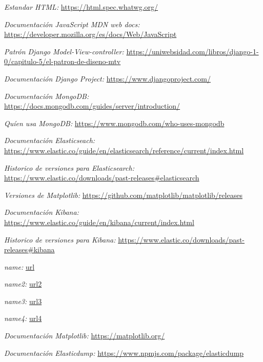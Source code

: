 \documentclass[11pt,a4paper]{book}
\begin{document}
	\begin{thebibliography}{7}
		
		
		\textit{Estandar HTML:}
		\url{https://html.spec.whatwg.org/}
	
		\textit{Documentación JavaScript MDN web docs:}
		\url{https://developer.mozilla.org/es/docs/Web/JavaScript}	
		
		\textit{Patrón Django Model-View-controller:}
		\url{https://uniwebsidad.com/libros/django-1-0/capitulo-5/el-patron-de-diseno-mtv}
		
		\textit{Documentación \textit{Django Project}:}
		\url{https://www.djangoproject.com/}
		
		\textit{Documentación MongoDB:}
		\url{https://docs.mongodb.com/guides/server/introduction/}	
		
		\textit{Quíen usa MongoDB:}
		\url{https://www.mongodb.com/who-uses-mongodb}
		
		\textit{Documentación Elasticseach:}
		\url{https://www.elastic.co/guide/en/elasticsearch/reference/current/index.html}
				
		\textit{Historico de versiones para Elasticsearch:}
		\url{https://www.elastic.co/downloads/past-releases#elasticsearch}	
		
				
		\textit{Versiones de Matplotlib:}
		\url{https://github.com/matplotlib/matplotlib/releases}	
				
		\textit{Documentación Kibana:}
		\url{https://www.elastic.co/guide/en/kibana/current/index.html}	
				
		\textit{Historico de versiones para Kibana:}
		\url{https://www.elastic.co/downloads/past-releases#kibana}	
				
		\textit{name:}
		\url{url}	
				
		\textit{name2:}
		\url{url2}	
				
		\textit{name3:}
		\url{url3}	
				
		\textit{name4:}
		\url{url4}			
		

		\textit{Documentación Matplotlib:}
		\url{https://matplotlib.org/}

		\textit{Documentación Elasticdump:}
		\url{https://www.npmjs.com/package/elasticdump}	
	
	
	
	
		
	

	
	\end{thebibliography}
\end{document}
